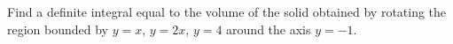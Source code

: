 \documentclass[12pt]{article}
\newcommand{\<}{\left\langle}
\renewcommand{\>}{\right\rangle}
\newcommand{\exerciseHeader}[4]{


  \vspace{0.5em}
  \textbf{#2}
  \vspace{0.5em}

}
\begin{document}
\begin{multicols}{2}
Find a definite integral equal to the volume of the solid obtained by
rotating the region bounded by \(y=x\), \(y=2x\), \(y=4\) around
the axis \(y=-1\).



%

%

%

%

%

%




\end{multicols}
\end{document}
